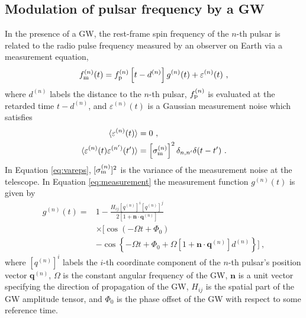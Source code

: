 \documentclass[fleqn,usenatbib,useAMS]{mnras}
\begin{document}
\subsection{Modulation of pulsar frequency by a GW} \label{sec:psr_measured}
In the presence of a GW, the rest-frame spin frequency of the $n$-th pulsar is related to the radio pulse frequency measured by an observer on Earth via a measurement equation,
\begin{equation}
	f_{\rm m}^{(n)}(t) = f_{\rm p}^{(n)}\left [t-d^{(n)} \right ] g^{(n)}(t) +  \varepsilon^{(n)}(t)\ ,
	\label{eq:measurement}
\end{equation}
where $d^{(n)}$ labels the distance to the $n$-th pulsar, $f_{\rm p}^{(n)}$ is evaluated at the retarded time $t-d^{(n)}$, and $\varepsilon^{(n)}(t)$ is a Gaussian measurement noise which satisfies 
\begin{align}
	\langle \varepsilon^{(n)}(t) \rangle &= 0 \ , \\
	\langle \varepsilon^{(n)}(t) \varepsilon^{(n')}(t') \rangle &= \left[\sigma_{\rm m}^{(n)}\right]^2 \delta_{n,n'} \delta(t - t') \ .	\label{eq:vareps}
\end{align}
In Equation \eqref{eq:vareps}, $[\sigma_{\rm m}^{(n)}]^2$ is the variance of the measurement noise at the telescope. In Equation \eqref{eq:measurement} the measurement function $g^{(n)}(t)$ is given by \citep[e.g.][]{Maggiore}
\begin{align}
	g^{(n)}(t) =& 1 - \frac{ H_{ij}[q^{(n)}]^i [q^{(n)}]^j }{2 [1 + \boldsymbol{n}\cdot \boldsymbol{q}^{(n)}] } \nonumber \\
	& \times \Big[\cos\left(-\Omega t +\Phi_0\right) \nonumber \\
	&- \cos \left \{-\Omega t +\Phi_0 + \Omega \left[1 + \boldsymbol{n}\cdot \boldsymbol{q}^{(n)} \right]  d^{(n)} \right \} \Big ] \ ,
	\label{eq:g_func_trig}
\end{align}
where $[q^{(n)}]^i$ labels the $i$-th coordinate component of the $n$-th pulsar's position vector $\boldsymbol{q}^{(n)}$, $\Omega$ is the constant angular frequency of the GW, $\boldsymbol{n}$ is a unit vector specifying the direction of propagation of the GW, $H_{ij}$ is the spatial part of the GW amplitude tensor, and $\Phi_0$ is the phase offset of the GW with respect to some reference time. \newline  
\end{document}
